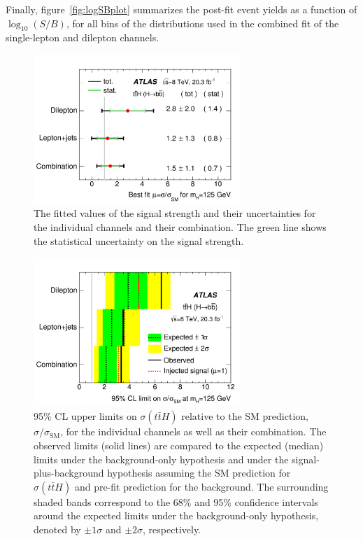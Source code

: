 Finally, figure~\ref{fig:logSBplot} summarizes the post-fit event yields as a function of $\log_{10}(S/B)$, 
for all bins of the distributions used in the combined fit of the single-lepton and dilepton channels. 


\begin{figure}[!tpb]
\begin{center}
\includegraphics[width=0.7\textwidth]{Analysis/Figures_ttH/MuPlot_Dic09.pdf}
\caption{The fitted values of the signal strength and their uncertainties for 
the individual channels and their 
combination.  The green line shows the statistical
uncertainty on the signal strength.}
\label{fig:fittedmu} 
\end{center}
\end{figure}

\begin{figure}[!tpb]
\begin{center}
\includegraphics[width=0.7\textwidth]{Analysis/Figures_ttH/LimitPlot_Dic09.pdf}
\caption{95\% CL upper limits on $\sigma(t\bar{t}H)$ relative to the SM prediction, $\sigma/\sigma_{\mathrm{SM}}$, for the individual 
channels as well as their combination. The observed 
limits (solid lines) are compared
to the expected (median) limits under the background-only hypothesis and under
the signal-plus-background hypothesis assuming the SM prediction 
for $\sigma(t\bar{t}H)$ and pre-fit prediction for the background.
The surrounding shaded bands correspond to the 68\% and 95\% confidence 
intervals around the expected limits under the background-only hypothesis, 
denoted by $\pm 1 \sigma$ and $\pm 2 \sigma$, respectively. }
\label{fig:limits} 
\end{center}
\end{figure}	



